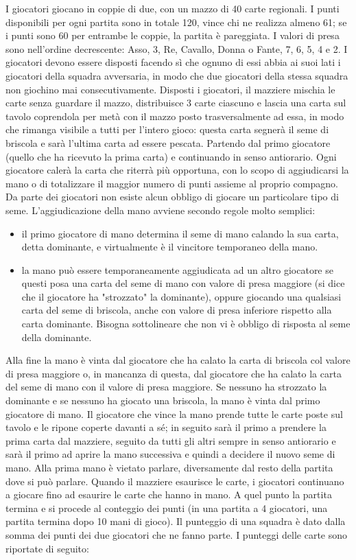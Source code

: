 \documentclass[a4paper,12pt]{article}
\begin{document}
I giocatori giocano in coppie di due, con un mazzo di 40 carte regionali. I punti disponibili per ogni partita sono in totale 120, vince chi ne realizza almeno 61; se i punti sono 60 per entrambe le coppie, la partita è pareggiata. I valori di presa sono nell'ordine decrescente: Asso, 3, Re, Cavallo, Donna o Fante, 7, 6, 5, 4 e 2. I giocatori devono essere disposti facendo sì che ognuno di essi abbia ai suoi lati i giocatori della squadra avversaria, in modo che due giocatori della stessa squadra non giochino mai consecutivamente. Disposti i giocatori, il mazziere mischia le carte senza guardare il mazzo, distribuisce 3 carte ciascuno e lascia una carta sul tavolo coprendola per metà con il mazzo posto trasversalmente ad essa, in modo che rimanga visibile a tutti per l'intero gioco: questa carta segnerà il seme di briscola e sarà l'ultima carta ad essere pescata. Partendo dal primo giocatore (quello che ha ricevuto la prima carta) e continuando in senso antiorario. Ogni giocatore calerà la carta che riterrà più opportuna, con lo scopo di aggiudicarsi la mano o di totalizzare il maggior numero di punti assieme al proprio compagno. Da parte dei giocatori non esiste alcun obbligo di giocare un particolare tipo di seme. L'aggiudicazione della mano avviene secondo regole molto semplici:
\begin{itemize}
	\item il primo giocatore di mano determina il seme di mano calando la sua carta, detta dominante, e virtualmente è il vincitore temporaneo della mano.
	\item la mano può essere temporaneamente aggiudicata ad un altro giocatore se questi posa una carta del seme di mano con valore di presa maggiore (si dice che il giocatore ha "strozzato" la dominante), oppure giocando una qualsiasi carta del seme di briscola, anche con valore di presa inferiore rispetto alla carta dominante. Bisogna sottolineare che non vi è obbligo di risposta al seme della dominante.
\end{itemize}
Alla fine la mano è vinta dal giocatore che ha calato la carta di briscola col valore di presa maggiore o, in mancanza di questa, dal giocatore che ha calato la carta del seme di mano con il valore di presa maggiore. Se nessuno ha strozzato la dominante e se nessuno ha giocato una briscola, la mano è vinta dal primo giocatore di mano. Il giocatore che vince la mano prende tutte le carte poste sul tavolo e le ripone coperte davanti a sé; in seguito sarà il primo a prendere la prima carta dal mazziere, seguito da tutti gli altri sempre in senso antiorario e sarà il primo ad aprire la mano successiva e quindi a decidere il nuovo seme di mano. Alla prima mano è vietato parlare, diversamente dal resto della partita dove si può parlare. Quando il mazziere esaurisce le carte, i giocatori continuano a giocare fino ad esaurire le carte che hanno in mano. A quel punto la partita termina e si procede al conteggio dei punti (in una partita a 4 giocatori, una partita termina dopo 10 mani di gioco). Il punteggio di una squadra è dato dalla somma dei punti dei due giocatori che ne fanno parte. I punteggi delle carte sono riportate di seguito:
\end{document}
